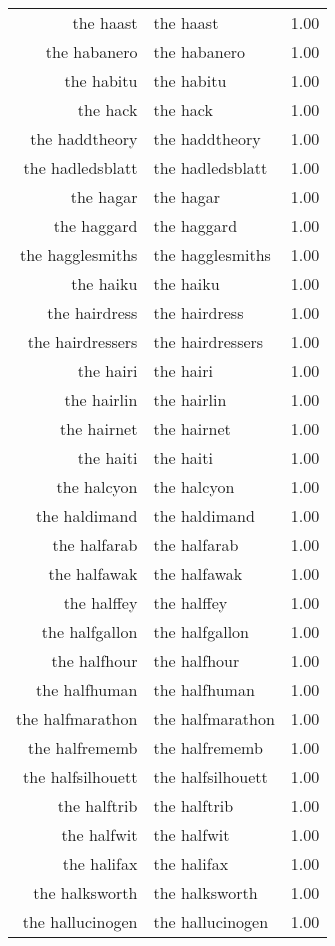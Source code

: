 \begin{table}[ht]
\begin{tabular}{rlr}
  the haast & the haast & 1.00 \\ 
  the habanero & the habanero & 1.00 \\ 
  the habitu & the habitu & 1.00 \\ 
  the hack & the hack & 1.00 \\ 
  the haddtheory & the haddtheory & 1.00 \\ 
  the hadledsblatt & the hadledsblatt & 1.00 \\ 
  the hagar & the hagar & 1.00 \\ 
  the haggard & the haggard & 1.00 \\ 
  the hagglesmiths & the hagglesmiths & 1.00 \\ 
  the haiku & the haiku & 1.00 \\ 
  the hairdress & the hairdress & 1.00 \\ 
  the hairdressers & the hairdressers & 1.00 \\ 
  the hairi & the hairi & 1.00 \\ 
  the hairlin & the hairlin & 1.00 \\ 
  the hairnet & the hairnet & 1.00 \\ 
  the haiti & the haiti & 1.00 \\ 
  the halcyon & the halcyon & 1.00 \\ 
  the haldimand & the haldimand & 1.00 \\ 
  the halfarab & the halfarab & 1.00 \\ 
  the halfawak & the halfawak & 1.00 \\ 
  the halffey & the halffey & 1.00 \\ 
  the halfgallon & the halfgallon & 1.00 \\ 
  the halfhour & the halfhour & 1.00 \\ 
  the halfhuman & the halfhuman & 1.00 \\ 
  the halfmarathon & the halfmarathon & 1.00 \\ 
  the halfrememb & the halfrememb & 1.00 \\ 
  the halfsilhouett & the halfsilhouett & 1.00 \\ 
  the halftrib & the halftrib & 1.00 \\ 
  the halfwit & the halfwit & 1.00 \\ 
  the halifax & the halifax & 1.00 \\ 
  the halksworth & the halksworth & 1.00 \\ 
  the hallucinogen & the hallucinogen & 1.00 \\ 

\end{tabular}
\end{table}
